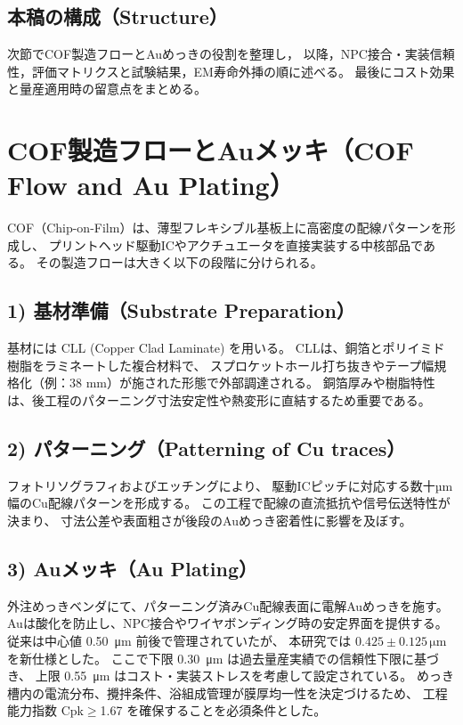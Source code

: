 \documentclass[conference]{IEEEtran}
\begin{document}
\subsection*{本稿の構成（Structure）}
次節でCOF製造フローとAuめっきの役割を整理し，
以降，NPC接合・実装信頼性，評価マトリクスと試験結果，EM寿命外挿の順に述べる。
最後にコスト効果と量産適用時の留意点をまとめる。

\section{COF製造フローとAuメッキ（COF Flow and Au Plating）}

COF（Chip-on-Film）は、薄型フレキシブル基板上に高密度の配線パターンを形成し、
プリントヘッド駆動ICやアクチュエータを直接実装する中核部品である。
その製造フローは大きく以下の段階に分けられる。

\subsection*{1) 基材準備（Substrate Preparation）}
基材には CLL (Copper Clad Laminate) を用いる。
CLLは、銅箔とポリイミド樹脂をラミネートした複合材料で、
スプロケットホール打ち抜きやテープ幅規格化（例：38 mm）が施された形態で外部調達される。
銅箔厚みや樹脂特性は、後工程のパターニング寸法安定性や熱変形に直結するため重要である。

\subsection*{2) パターニング（Patterning of Cu traces）}
フォトリソグラフィおよびエッチングにより、
駆動ICピッチに対応する数十µm幅のCu配線パターンを形成する。
この工程で配線の直流抵抗や信号伝送特性が決まり、
寸法公差や表面粗さが後段のAuめっき密着性に影響を及ぼす。

\subsection*{3) Auメッキ（Au Plating）}
外注めっきベンダにて、パターニング済みCu配線表面に電解Auめっきを施す。
Auは酸化を防止し、NPC接合やワイヤボンディング時の安定界面を提供する。
従来は中心値 \SI{0.50}{\micro\meter} 前後で管理されていたが、
本研究では \textbf{$0.425 \pm 0.125\,\si{\micro\meter}$} を新仕様とした。
ここで下限 \SI{0.30}{\micro\meter} は過去量産実績での信頼性下限に基づき、
上限 \SI{0.55}{\micro\meter} はコスト・実装ストレスを考慮して設定されている。
めっき槽内の電流分布、攪拌条件、浴組成管理が膜厚均一性を決定づけるため、
工程能力指数 Cpk$\geq$1.67 を確保することを必須条件とした。
\end{document}
